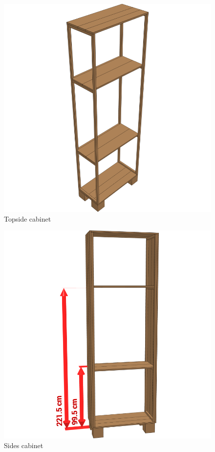 \documentclass{article}
\begin{document}
\begin{figure}[h!]
    \centering
    \includegraphics[width=\textwidth]{scene 7 - boven.png}
    \caption{Topside cabinet}
\end{figure}

\begin{figure}[h!]
    \centering
    \includegraphics[width=\textwidth]{scene 8 - links_rechts.png}
    \caption{Sides cabinet}
\end{figure}
\end{document}
